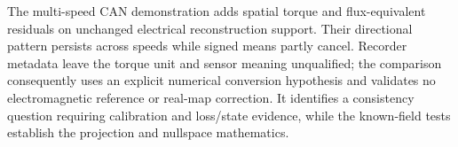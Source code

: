 The multi-speed CAN demonstration adds spatial torque and flux-equivalent
residuals on unchanged electrical reconstruction support. Their directional
pattern persists across speeds while signed means partly cancel.
Recorder metadata leave the torque unit and sensor meaning unqualified;
the comparison consequently uses an explicit numerical conversion
hypothesis and validates no electromagnetic reference or real-map correction.
It identifies a consistency question requiring calibration and loss/state
evidence, while the known-field tests establish the projection and nullspace
mathematics.
